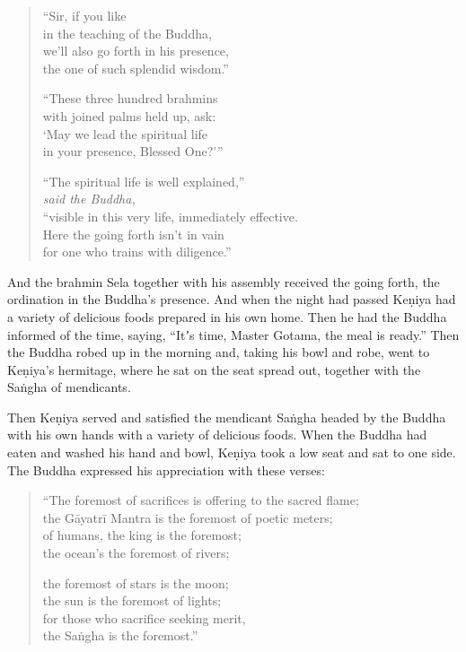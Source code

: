 \documentclass[12pt,openany]{book}%
\newcommand*{\scspeaker}[1]{\hspace{2em}\textit{#1}}
\begin{document}
\begin{verse}
“Sir, if you like \\
in the teaching of the Buddha, \\
we’ll also go forth in his presence, \\
the one of such splendid wisdom.” 

“These three hundred brahmins \\
with joined palms held up, ask: \\
‘May we lead the spiritual life \\
in your presence, Blessed One?’” 

“The spiritual life is well explained,” \\
\scspeaker{said the Buddha, }\\
“visible in this very life, immediately effective. \\
Here the going forth isn’t in vain \\
for one who trains with diligence.” 

%
\end{verse}

And the brahmin Sela together with his assembly received the going forth, the ordination in the Buddha’s presence. And when the night had passed \textsanskrit{Keṇiya} had a variety of delicious foods prepared in his own home. Then he had the Buddha informed of the time, saying, “Itʼs time, Master Gotama, the meal is ready.” Then the Buddha robed up in the morning and, taking his bowl and robe, went to \textsanskrit{Keṇiya}’s hermitage, where he sat on the seat spread out, together with the \textsanskrit{Saṅgha} of mendicants. 

Then \textsanskrit{Keṇiya} served and satisfied the mendicant \textsanskrit{Saṅgha} headed by the Buddha with his own hands with a variety of delicious foods. When the Buddha had eaten and washed his hand and bowl, \textsanskrit{Keṇiya} took a low seat and sat to one side. The Buddha expressed his appreciation with these verses: 

\begin{verse}%
“The foremost of sacrifices is offering to the sacred flame; \\
the \textsanskrit{Gāyatrī} Mantra is the foremost of poetic meters; \\
of humans, the king is the foremost; \\
the ocean’s the foremost of rivers; 

the foremost of stars is the moon; \\
the sun is the foremost of lights; \\
for those who sacrifice seeking merit, \\
the \textsanskrit{Saṅgha} is the foremost.” 

%
\end{verse}
\end{document}
